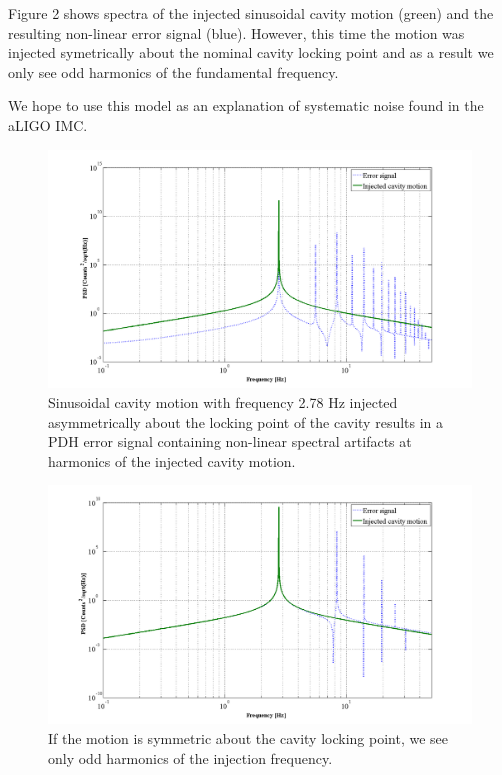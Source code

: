 Figure 2 shows spectra of the injected sinusoidal cavity motion (green) and the resulting non-linear error signal (blue). However, this time the motion was injected symetrically about the nominal cavity locking point and as a result we only see odd harmonics of the fundamental frequency.

We hope to use this model as an explanation of systematic noise found in the aLIGO IMC.

\begin{figure}[h!]
\includegraphics[height=0.6\textwidth]{figures/IMCUpconversion/PDH_error_signal_harmonics.png}
\caption[PDH response to asymmetric cavity motion]{Sinusoidal cavity motion with frequency 2.78 Hz injected asymmetrically about the locking point of the cavity results in a PDH error signal containing non-linear spectral artifacts at harmonics of the injected cavity motion.}
\end{figure}

\begin{figure}[h!]
\includegraphics[height=0.6\textwidth]{figures/IMCUpconversion/symmetric_PDH.png}
\caption[PDH response to symmetric cavity motion]{If the motion is symmetric about the cavity locking point, we see only odd harmonics of the injection frequency.}
\end{figure}

